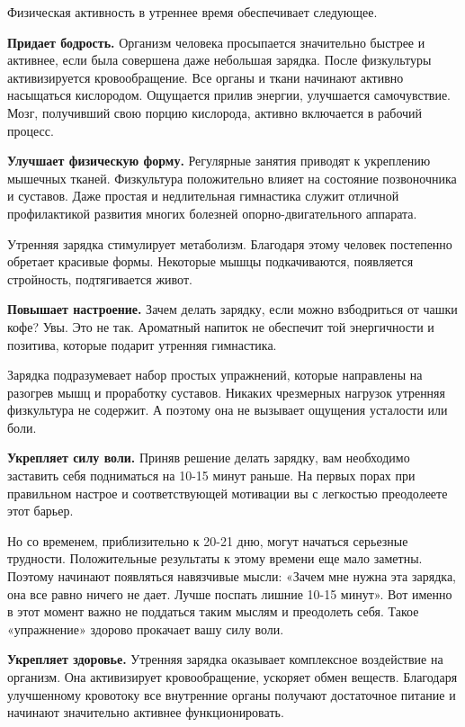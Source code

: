 Физическая активность в утреннее время обеспечивает следующее.

\textbf{Придает бодрость.} Организм человека просыпается значительно быстрее и активнее, если была совершена даже небольшая зарядка. После физкультуры активизируется кровообращение. Все органы и ткани начинают активно насыщаться кислородом. Ощущается прилив энергии, улучшается самочувствие. Мозг, получивший свою порцию кислорода, активно включается в рабочий процесс.


\textbf{Улучшает физическую форму.} Регулярные занятия приводят к укреплению мышечных тканей. Физкультура положительно влияет на состояние позвоночника и суставов. Даже простая и недлительная гимнастика служит отличной профилактикой развития многих болезней опорно-двигательного аппарата.

Утренняя зарядка стимулирует метаболизм. Благодаря этому человек постепенно обретает красивые формы. Некоторые мышцы подкачиваются, появляется стройность, подтягивается живот.

\textbf{Повышает настроение.} Зачем делать зарядку, если можно взбодриться от чашки кофе? Увы. Это не так. Ароматный напиток не обеспечит той энергичности и позитива, которые подарит утренняя гимнастика.

Зарядка подразумевает набор простых упражнений, которые направлены на разогрев мышц и проработку суставов. Никаких чрезмерных нагрузок утренняя физкультура не содержит. А поэтому она не вызывает ощущения усталости или боли.

\textbf{Укрепляет силу воли.}   Приняв решение делать зарядку, вам необходимо заставить себя подниматься на 10-15 минут раньше. На первых порах при правильном настрое и соответствующей мотивации вы с легкостью преодолеете этот барьер.

Но со временем, приблизительно к 20-21 дню, могут начаться серьезные трудности. Положительные результаты к этому времени еще мало заметны. Поэтому начинают появляться навязчивые мысли: «Зачем мне нужна эта зарядка, она все равно ничего не дает. Лучше поспать лишние 10-15 минут». Вот именно в этот момент важно не поддаться таким мыслям и преодолеть себя. Такое «упражнение» здорово прокачает вашу силу воли.

\textbf{Укрепляет здоровье.}
Утренняя зарядка оказывает комплексное воздействие на организм. Она активизирует кровообращение, ускоряет обмен веществ. Благодаря улучшенному кровотоку все внутренние органы получают достаточное питание и начинают значительно активнее функционировать.

